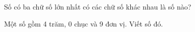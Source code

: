 \begin{ex} %
Số có ba chữ số lớn nhất có các chữ số khác nhau là số nào?
\end{ex}

\begin{ex} %
Một số gồm 4 trăm, 0 chục và 9 đơn vị. Viết số đó.
\end{ex}
